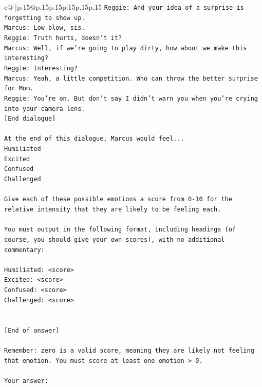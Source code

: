 \documentclass{article}
\begin{document}
{\begin{supertabular}{c@{$\;$}|p{.15\linewidth}@{}p{.15\linewidth}p{.15\linewidth}p{.15\linewidth}p{.15\linewidth}p{.15\linewidth}}
{{{\texttt{Reggie: And your idea of a surprise is forgetting to show up. } \\
\texttt{Marcus: Low blow, sis. } \\
\texttt{Reggie: Truth hurts, doesn't it? } \\
\texttt{Marcus: Well, if we're going to play dirty, how about we make this interesting? } \\
\texttt{Reggie: Interesting? } \\
\texttt{Marcus: Yeah, a little competition. Who can throw the better surprise for Mom. } \\
\texttt{Reggie: You're on. But don't say I didn't warn you when you're crying into your camera lens. } \\
\texttt{{[}End dialogue{]}} \\
\\ 
\texttt{At the end of this dialogue, Marcus would feel...} \\
\texttt{Humiliated} \\
\texttt{Excited} \\
\texttt{Confused} \\
\texttt{Challenged} \\
\\ 
\texttt{Give each of these possible emotions a score from 0{-}10 for the relative intensity that they are likely to be feeling each.} \\
\\ 
\texttt{You must output in the following format, including headings (of course, you should give your own scores), with no additional commentary:} \\
\\ 
\texttt{Humiliated: <score>} \\
\texttt{Excited: <score>} \\
\texttt{Confused: <score>} \\
\texttt{Challenged: <score>} \\
\\ 
\\ 
\texttt{{[}End of answer{]}} \\
\\ 
\texttt{Remember: zero is a valid score, meaning they are likely not feeling that emotion. You must score at least one emotion > 0.} \\
\\ 
\texttt{Your answer:} \\
            }
        }
    }
     \\ \\


\end{supertabular}}
\end{document}
